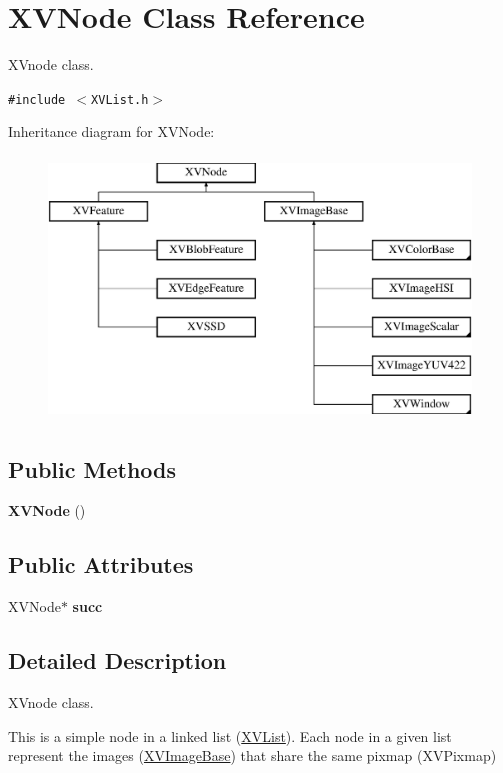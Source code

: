 \hypertarget{class_XVNode}{
\section{XVNode  Class Reference}
\label{XVNode}
}
XVnode class. 


{\tt \#include $<$XVList.h$>$}

Inheritance diagram for XVNode:\begin{figure}[H]
\begin{center}
\leavevmode
\includegraphics[height=7cm]{class_XVNode}
\end{center}
\end{figure}
\subsection*{Public Methods}
\begin{CompactItemize}
\item 
{\bf XVNode} ()
\end{CompactItemize}
\subsection*{Public Attributes}
\begin{CompactItemize}
\item 
XVNode$\ast$ {\bf succ}
\end{CompactItemize}


\subsection{Detailed Description}
XVnode class.

This is a simple node in a linked list (\hyperlink{class_XVList}{XVList}). Each node in a given list represent the images (\hyperlink{class_XVImageBase}{XVImage\-Base}) that share the same pixmap (XVPixmap) 



